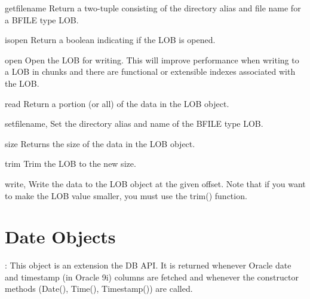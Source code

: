 \documentclass{manual}
\begin{document}
\begin{funcdesc}{getfilename}{}
  Return a two-tuple consisting of the directory alias and file name for a
  BFILE type LOB.
\end{funcdesc}

\begin{funcdesc}{isopen}{}
  Return a boolean indicating if the LOB is opened.
\end{funcdesc}

\begin{funcdesc}{open}{}
  Open the LOB for writing. This will improve performance when writing to a LOB
  in chunks and there are functional or extensible indexes associated with the
  LOB.
\end{funcdesc}

\begin{funcdesc}{read}{}
  Return a portion (or all) of the data in the LOB object.
\end{funcdesc}

\begin{funcdesc}{setfilename}{, }
  Set the directory alias and name of the BFILE type LOB.
\end{funcdesc}

\begin{funcdesc}{size}{}
  Returns the size of the data in the LOB object.
\end{funcdesc}

\begin{funcdesc}{trim}{}
  Trim the LOB to the new size.
\end{funcdesc}

\begin{funcdesc}{write}{, }
  Write the data to the LOB object at the given offset. Note that if you want
  to make the LOB value smaller, you must use the trim() function.
\end{funcdesc}

\chapter{Date Objects\label{dateobj}}

: This object is an extension the DB API. It is returned whenever
Oracle date and timestamp (in Oracle 9i) columns are fetched and whenever the
constructor methods (Date(), Time(), Timestamp()) are called.
\end{document}

